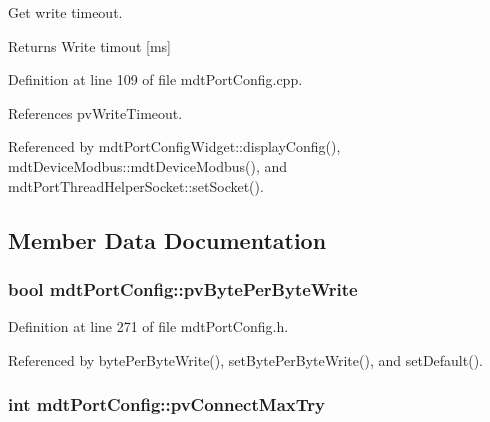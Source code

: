 Get write timeout. 

\begin{DoxyReturn}{Returns}
Write timout \mbox{[}ms\mbox{]} 
\end{DoxyReturn}


Definition at line 109 of file mdt\-Port\-Config.\-cpp.



References pv\-Write\-Timeout.



Referenced by mdt\-Port\-Config\-Widget\-::display\-Config(), mdt\-Device\-Modbus\-::mdt\-Device\-Modbus(), and mdt\-Port\-Thread\-Helper\-Socket\-::set\-Socket().



\subsection{Member Data Documentation}
\hypertarget{classmdt_port_config_a56fb67591803bc972772073a6f2b996d}{
\subsubsection[{pv\-Byte\-Per\-Byte\-Write}]{\setlength{\rightskip}{0pt plus 5cm}bool mdt\-Port\-Config\-::pv\-Byte\-Per\-Byte\-Write\hspace{0.3cm}{\ttfamily [protected]}}}\label{classmdt_port_config_a56fb67591803bc972772073a6f2b996d}


Definition at line 271 of file mdt\-Port\-Config.\-h.



Referenced by byte\-Per\-Byte\-Write(), set\-Byte\-Per\-Byte\-Write(), and set\-Default().

\hypertarget{classmdt_port_config_a46b87d1b9c2dbe30688497c34807d93c}{
\subsubsection[{pv\-Connect\-Max\-Try}]{\setlength{\rightskip}{0pt plus 5cm}int mdt\-Port\-Config\-::pv\-Connect\-Max\-Try\hspace{0.3cm}{\ttfamily [protected]}}}\label{classmdt_port_config_a46b87d1b9c2dbe30688497c34807d93c}


